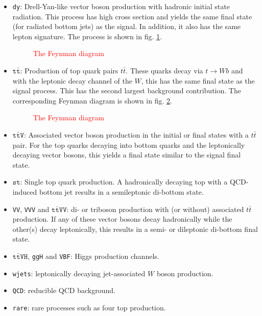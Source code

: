\begin{itemize}
	\item[] \texttt{dy}: Drell-Yan-like vector boson production with hadronic initial state radiation. This process has high cross section and yields the same final state (for radiated bottom jets) as the signal. In addition, it also has the same lepton signature. The process is shown in fig. \ref{fig:dy_background}.
	\begin{figure}[h!]
		\centering
		\caption{\textcolor{red}{The Feynman diagram}}
		\label{fig:dy_background}
	\end{figure}
	\item[] $\texttt{t}\bar{\texttt{t}}$: Production of top quark pairs $t\bar{t}$. These quarks decay via $t\rightarrow Wb$ and with the leptonic decay channel of the $W$, this has the same final state as the signal process. This has the second largest background contribution. The corresponding Feynman diagram is shown in fig. \ref{fig:tt_background}.
	\begin{figure}[h!]
		\centering
		\caption{\textcolor{red}{The Feynman diagram}}
		\label{fig:tt_background}
	\end{figure}
	\item[] $\texttt{t}\bar{\texttt{t}}\texttt{V}$: Associated vector boson production in the initial or final states with a $t\bar{t}$ pair. For the top quarks decaying into bottom quarks and the leptonically decaying vector bosons, this yields a final state similar to the signal final state.
	\item[] $\texttt{st}$: Single top quark production. A hadronically decaying top with a QCD-induced bottom jet results in a semileptonic di-bottom state.
	\item[] \texttt{VV}, \texttt{VVV} and $\texttt{t}{\bar{\texttt{t}}}\texttt{VV}$: di- or triboson production with (or without) associated $t\bar{t}$ production. If any of these vector bosons decay hadronically while the other(s) decay leptonically, this results in a semi- or dileptonic di-bottom final state.
	\item[] $\texttt{t}\bar{\texttt{t}}\texttt{VH}$, \texttt{ggH} and \texttt{VBF}: Higgs production channels.
	\item[] \texttt{wjets}: leptonically decaying jet-associated $W$ boson production.
	\item[] \texttt{QCD}: reducible QCD background.
	\item[] \texttt{rare}: rare processes such as four top production.
\end{itemize}

